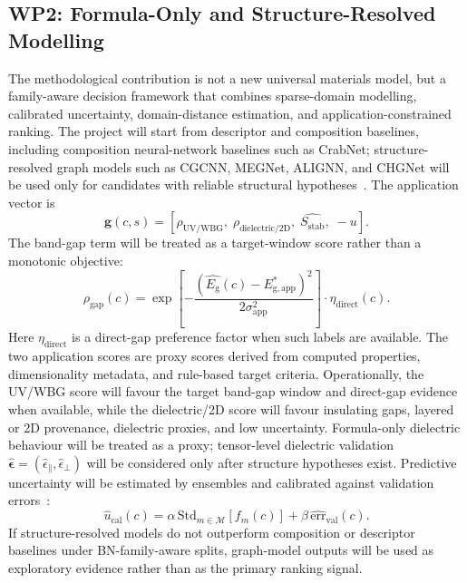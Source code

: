 \documentclass[10pt,a4paper]{article}
\newcommand{\eg}{E_{\mathrm{g}}}
\newcommand{\unc}{u}
\newcommand{\stab}{S_{\mathrm{stab}}}
\newcommand{\gapscore}{\rho_{\mathrm{gap}}}
\begin{document}
\subsection{WP2: Formula-Only and Structure-Resolved Modelling}
The methodological contribution is not a new universal materials model, but a family-aware decision framework that combines sparse-domain modelling, calibrated uncertainty, domain-distance estimation, and application-constrained ranking. The project will start from descriptor and composition baselines, including composition neural-network baselines such as CrabNet; structure-resolved graph models such as CGCNN, MEGNet, ALIGNN, and CHGNet will be used only for candidates with reliable structural hypotheses~\cite{ong2013_pymatgen,wang2021_crabnet,xie2018_cgcnn,chen2019_megnet,choudhary2021_alignn,deng2023_chgnet}. The application vector is
\[
  \mathbf{g}(c,s)=
  [\rho_{\mathrm{UV/WBG}},\;\rho_{\mathrm{dielectric/2D}},\;
  \hat{\stab},\;-\unc].
\]
The band-gap term will be treated as a target-window score rather than a monotonic objective:
\[
  \gapscore(c)=
  \exp\!\left[-\frac{(\hat{\eg}(c)-E^*_{\mathrm{g,app}})^2}{2\sigma_{\mathrm{app}}^2}\right]
  \cdot\eta_{\mathrm{direct}}(c).
\]
Here $\eta_{\mathrm{direct}}$ is a direct-gap preference factor when such labels are available. The two application scores are proxy scores derived from computed properties, dimensionality metadata, and rule-based target criteria. Operationally, the UV/WBG score will favour the target band-gap window and direct-gap evidence when available, while the dielectric/2D score will favour insulating gaps, layered or 2D provenance, dielectric proxies, and low uncertainty. Formula-only dielectric behaviour will be treated as a proxy; tensor-level dielectric validation $\hat{\boldsymbol{\epsilon}}=(\hat{\epsilon}_{\parallel},\hat{\epsilon}_{\perp})$ will be considered only after structure hypotheses exist. Predictive uncertainty will be estimated by ensembles and calibrated against validation errors~\cite{gal2016_dropout,lakshminarayanan2017_ensembles}:
\[
  \hat{\unc}_{\mathrm{cal}}(c)=
  \alpha\,\mathrm{Std}_{m\in\mathcal{M}}\!\left[f_m(c)\right]+
  \beta\,\widehat{\mathrm{err}}_{\mathrm{val}}(c).
\]
If structure-resolved models do not outperform composition or descriptor baselines under BN-family-aware splits, graph-model outputs will be used as exploratory evidence rather than as the primary ranking signal.
\end{document}
